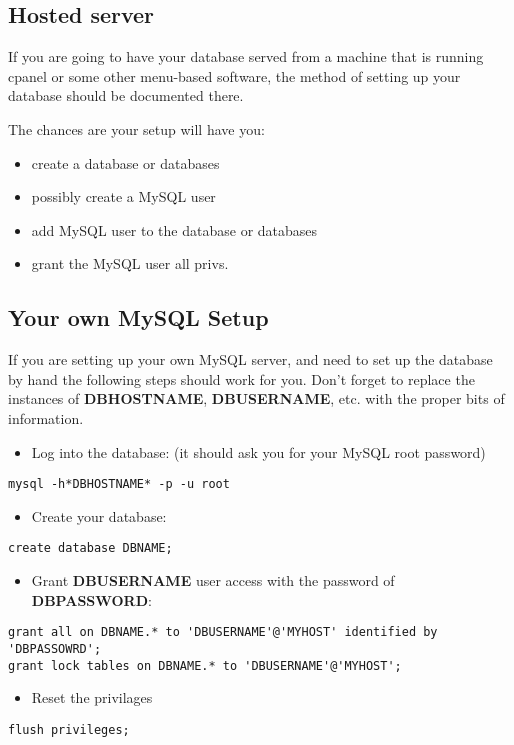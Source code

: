 \documentclass[captions=tablesignature]{scrartcl}
\begin{document}
\subsection{Hosted server}
\label{sec-4-1}
If you are going to have your database served from a machine that
is running cpanel or some other menu-based software, the method of
setting up your database should be documented there.

The chances are your setup will have you:
\begin{itemize}
\item create a database or databases
\item possibly create a MySQL user
\item add MySQL user to the database or databases
\item grant the MySQL user all privs.
\end{itemize}

\subsection{Your own MySQL Setup}
\label{sec-4-2}
If you are setting up your own MySQL server, and need to set up the
database by hand the following steps should work for you.  Don't
forget to replace the instances of \textbf{DBHOSTNAME}, \textbf{DBUSERNAME},
etc. with the proper bits of information.

\begin{itemize}
\item Log into the database: (it should ask you for your MySQL root password)
\end{itemize}
\begin{verbatim}
mysql -h*DBHOSTNAME* -p -u root
\end{verbatim}
\begin{itemize}
\item Create your database:
\end{itemize}
\begin{verbatim}
create database DBNAME;
\end{verbatim}
\begin{itemize}
\item Grant \textbf{DBUSERNAME} user access with the password of \textbf{DBPASSWORD}:
\end{itemize}
\begin{verbatim}
grant all on DBNAME.* to 'DBUSERNAME'@'MYHOST' identified by 'DBPASSOWRD';
grant lock tables on DBNAME.* to 'DBUSERNAME'@'MYHOST';
\end{verbatim}
\begin{itemize}
\item Reset the privilages
\end{itemize}
\begin{verbatim}
flush privileges;
\end{verbatim}
\end{document}
